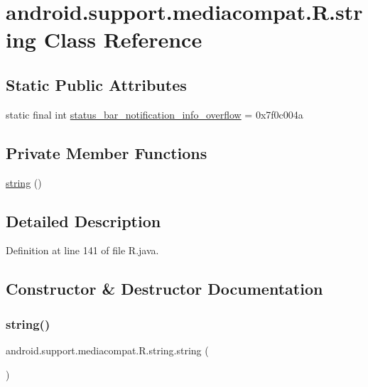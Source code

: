 \hypertarget{classandroid_1_1support_1_1mediacompat_1_1_r_1_1string}{}\section{android.\+support.\+mediacompat.\+R.\+string Class Reference}
\label{classandroid_1_1support_1_1mediacompat_1_1_r_1_1string}
\subsection*{Static Public Attributes}
\begin{DoxyCompactItemize}
\item 
static final int \mbox{\hyperlink{classandroid_1_1support_1_1mediacompat_1_1_r_1_1string_a61a68d0b52b88ec2a9d2824d55d92090}{status\+\_\+bar\+\_\+notification\+\_\+info\+\_\+overflow}} = 0x7f0c004a
\end{DoxyCompactItemize}
\subsection*{Private Member Functions}
\begin{DoxyCompactItemize}
\item 
\mbox{\hyperlink{classandroid_1_1support_1_1mediacompat_1_1_r_1_1string_a4ab7f84ef3d7319b55512cd51e42d4d4}{string}} ()
\end{DoxyCompactItemize}


\subsection{Detailed Description}


Definition at line 141 of file R.\+java.



\subsection{Constructor \& Destructor Documentation}
\mbox{\label{classandroid_1_1support_1_1mediacompat_1_1_r_1_1string_a4ab7f84ef3d7319b55512cd51e42d4d4}} 
\subsubsection{\texorpdfstring{string()}{string()}}
{\footnotesize\ttfamily android.\+support.\+mediacompat.\+R.\+string.\+string (\begin{DoxyParamCaption}{ }\end{DoxyParamCaption})\hspace{0.3cm}{\ttfamily [private]}}



